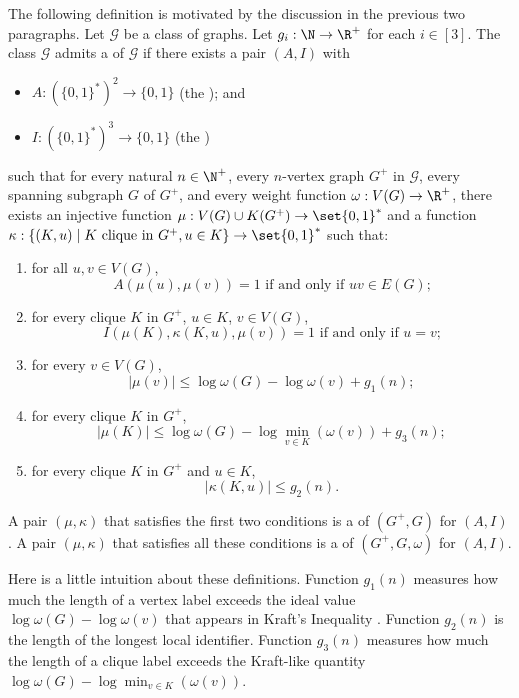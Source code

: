 The following definition is motivated by the discussion in the previous two paragraphs. Let $\mathcal{G}$ be a class of graphs.
Let $g_i:\N\to\R^+$ for each $i\in[3]$.
The class  $\mathcal{G}$ admits a  of $\mathcal{G}$ if there exists a pair $(A,I)$ with
\begin{itemize}[nosep,nolistsep]
  \item $A:(\{0,1\}^*)^2\to\{0,1\}$ (the ); and
  \item $I:(\{0,1\}^*)^3\to\{0,1\}$ (the )
\end{itemize}
such that
for every natural $n\in\N^+$,
every $n$-vertex graph $G^+$ in $\mathcal{G}$,
every spanning subgraph $G$ of $G^+$, and
every weight function $\omega:V(G)\to \R^+$,
there exists an injective function $\mu: V(G)\cup K(G^+) \to \set{0,1}^*$ and a function $\kappa:\{(K, u)\mid \textrm{$K$ clique in $G^+$}, u\in K\}\to \set{0,1}^*$
such that:
\begin{enumerate}[nosep,nolistsep,label=(\roman*)]
  \item for all $u,v\in V(G)$,
        \[
          \textrm{$A(\mu(u),\mu(v))=1$ if and only if $uv\in E(G)$;}
        \]
  \item for every clique $K$ in $G^+$, $u\in K$, $v\in V(G)$,
        \[
          \textrm{$I(\mu(K),\kappa(K, u),\mu(v))=1$ if and only if $u=v$;}
        \]
  \item for every $v\in V(G)$,
        \[
          |\mu(v)| \leq \log \omega(G) - \log\omega(v) + g_1(n);
        \]
  \item for every clique $K$ in $G^+$,
        \[
          |\mu(K)|\le \log \omega(G) - \log\min_{v\in K}(\omega(v)) + g_3(n);
        \]
  \item  for every clique $K$ in $G^+$ and $u\in K$,
        \[
          |\kappa(K, u)| \leq g_2(n).
        \]
\end{enumerate}
A pair $(\mu,\kappa)$ that satisfies the first two conditions is a  of $(G^+,G)$ for $(A,I)$.  A pair $(\mu,\kappa)$ that satisfies all these conditions is a  of $(G^+,G,\omega)$ for $(A,I)$.


Here is a little intuition about these definitions. Function $g_1(n)$ measures how much the length of a vertex label exceeds the ideal value $\log \omega(G) - \log\omega(v)$ that appears in Kraft's Inequality \cite{Kraft1949}. Function $g_2(n)$ is the length of the longest local identifier. Function $g_3(n)$ measures how much the length of a clique label exceeds the Kraft-like quantity $\log\omega(G)-\log\min_{v\in K}(\omega(v))$.

